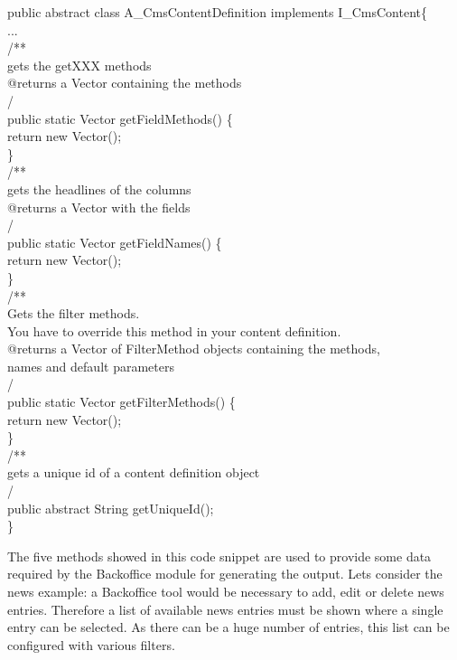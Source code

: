 \begin{java}
public abstract class A\_CmsContentDefinition implements I\_CmsContent\{\\
\jtaba ...\\[1ex]
\jtaba        /**\\
\jtaba \xspace * gets the getXXX methods\\
\jtaba \xspace * @returns a Vector containing the methods\\
\jtaba \xspace */\\
\jtaba public static Vector getFieldMethods() \{\\
\jtabb    return new Vector();\\
\jtaba \}\\[1ex]

\jtaba        /**\\
\jtaba \xspace * gets the headlines of the columns\\
\jtaba \xspace * @returns a Vector with the fields\\
\jtaba \xspace */\\
\jtaba public static Vector getFieldNames() \{\\
\jtabb return new Vector();\\
\jtaba \}\\[1ex]

\jtaba        /**\\
\jtaba \xspace * Gets the filter methods.\\
\jtaba \xspace * You have to override this method in your content definition.\\
\jtaba \xspace * @returns a Vector of FilterMethod objects containing the methods,\\
\jtaba \xspace * names and default parameters\\
\jtaba \xspace */\\
\jtaba public static Vector getFilterMethods() \{\\
\jtabb        return new Vector();\\
\jtaba  \}\\[1ex]

\jtaba        /**\\
\jtaba \xspace * gets a unique id of a content definition object\\
\jtaba \xspace */\\
\jtaba public abstract String getUniqueId();\\
\}
\end{java}

The five methods showed in this code snippet are used to provide some data required by
the Backoffice module for generating the output. Lets consider
the news example: a Backoffice tool would be necessary to add, edit or
delete news entries. Therefore a list of available news entries must be
shown where a single entry can be selected. As there can be a huge
number of entries, this list can be configured with various filters.

